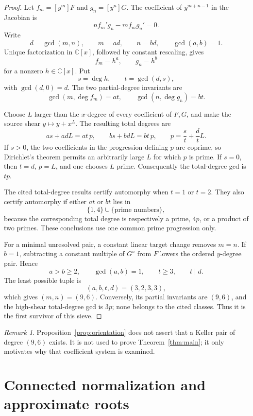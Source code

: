 \documentclass[11pt]{article}
\theoremstyle{definition}
\theoremstyle{remark}
\newtheorem{remark}[theorem]{Remark}
\newcommand{\C}{\mathbb C}
\begin{document}
\begin{proof}
Let \(f_m=[y^m]F\) and \(g_n=[y^n]G\).  The coefficient of
\(y^{m+n-1}\) in the Jacobian is
\[
 n f_m'g_n-m f_mg_n'=0.
\]
Write
\[
 d=\gcd(m,n),\qquad m=ad,\qquad n=bd,\qquad \gcd(a,b)=1.
\]
Unique factorization in \(\C[x]\), followed by constant rescaling, gives
\[
 f_m=h^a,\qquad g_n=h^b
\]
for a nonzero \(h\in\C[x]\).  Put
\[
 s=\deg h,\qquad t=\gcd(d,s),
\]
with \(\gcd(d,0)=d\).  The two partial-degree invariants are
\[
 \gcd(m,\deg f_m)=at,\qquad
 \gcd(n,\deg g_n)=bt.
\]

Choose \(L\) larger than the \(x\)-degree of every coefficient of
\(F,G\), and make the source shear \(y\mapsto y+x^L\).  The resulting
total degrees are
\[
 as+adL=at\,p,\qquad bs+bdL=bt\,p,
 \qquad p=\frac{s}{t}+\frac{d}{t}L.
\]
If \(s>0\), the two coefficients in the progression defining \(p\) are
coprime, so Dirichlet's theorem permits an arbitrarily large \(L\) for
which \(p\) is prime.  If \(s=0\), then \(t=d\), \(p=L\), and one
chooses \(L\) prime.  Consequently the total-degree gcd is \(tp\).

The cited total-degree results certify automorphy when \(t=1\) or
\(t=2\).  They also certify automorphy if either \(at\) or \(bt\) lies
in
\[
 \{1,4\}\cup\{\text{prime numbers}\},
\]
because the corresponding total degree is respectively a prime,
\(4p\), or a product of two primes.  These conclusions use one common
prime progression only.

For a minimal unresolved pair, a constant linear target change removes
\(m=n\).  If \(b=1\), subtracting a constant multiple of \(G^a\) from
\(F\) lowers the ordered \(y\)-degree pair.  Hence
\[
 a>b\geq2,\qquad \gcd(a,b)=1,\qquad t\geq3,\qquad t\mid d.
\]
The least possible tuple is
\[
 (a,b,t,d)=(3,2,3,3),
\]
which gives \((m,n)=(9,6)\).  Conversely, its partial invariants are
\((9,6)\), and the high-shear total-degree gcd is \(3p\); none belongs
to the cited classes.  Thus it is the first survivor of this sieve.
\end{proof}

\begin{remark}
Proposition~\ref{prop:orientation} does not assert that a Keller pair of
degree \((9,6)\) exists.  It is not used to prove
Theorem~\ref{thm:main}; it only motivates why that coefficient system
is examined.
\end{remark}

\section{Connected normalization and approximate roots}
\label{sec:normalization}
\end{document}
